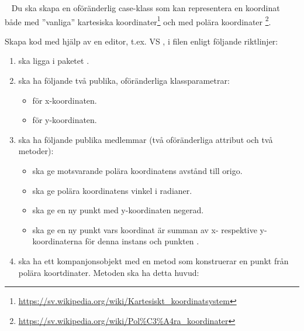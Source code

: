 \QUESTBEGIN

\Task \what~
Du ska skapa en oföränderlig case-klass  som kan representera en koordinat både med ''vanliga'' kartesiska koordinater\footnote{\url{https://sv.wikipedia.org/wiki/Kartesiskt_koordinatsystem}} och med polära koordinater%
\footnote{\url{https://sv.wikipedia.org/wiki/Pol\%C3\%A4ra\_koordinater}}.

\Subtask Skapa kod med hjälp av en editor, t.ex. VS , i filen   enligt följande riktlinjer:
\begin{enumerate}[noitemsep]
\item {} ska ligga i paketet .

\item {} ska ha följande två publika, oföränderliga klassparametrar:
\begin{itemize}[nolistsep, noitemsep]
\item {} för x-koordinaten.
\item {} för y-koordinaten.
\end{itemize}

\item {} ska ha följande publika medlemmar (två oföränderliga attribut och två metoder):
\begin{itemize}[nolistsep, noitemsep]
\item {} ska ge motsvarande polära koordinatens
 avstånd till origo.
\item {} ska ge polära koordinatens vinkel i radianer.
\item {} ska ge en ny punkt med y-koordinaten negerad.
\item {} ska ge en ny punkt vars koordinat är summan av x- respektive y-koordinaterna för denna instans och punkten .
\end{itemize}

\item {} ska ha ett kompanjonsobjekt med en metod som konstruerar en punkt från polära koortdinater. Metoden ska ha detta huvud: \\

\end{enumerate}

